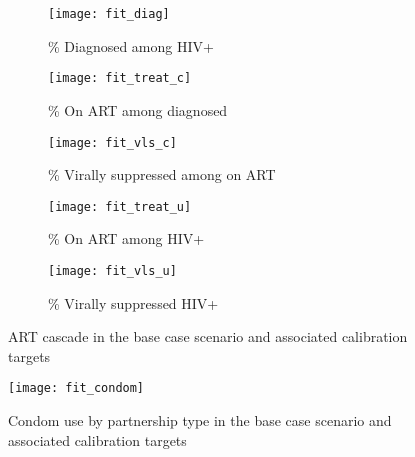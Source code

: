 \begin{figure}[h]
  \begin{subfigure}{\linewidth}
    \texttt{[image: fit\_diag]}
    \caption{\% Diagnosed among HIV+}
    \label{fig:fit.cas.dx}
  \end{subfigure}
  \begin{subfigure}{\linewidth}
    \texttt{[image: fit\_treat\_c]}
    \caption{\% On ART among diagnosed}
    \label{fig:fit.cas.treat-c}
  \end{subfigure}
  \begin{subfigure}{\linewidth}
    \texttt{[image: fit\_vls\_c]}
    \caption{\% Virally suppressed among on ART}
    \label{fig:fit.cas.vls-c}
  \end{subfigure}
  \begin{subfigure}{\linewidth}
    \texttt{[image: fit\_treat\_u]}
    \caption{\% On ART among HIV+}
    \label{fig:fit.cas.treat-u}
  \end{subfigure}
  \begin{subfigure}{\linewidth}
    \texttt{[image: fit\_vls\_u]}
    \caption{\% Virally suppressed HIV+}
    \label{fig:fit.cas.vls-u}
  \end{subfigure}
  \caption{ART cascade in the base case scenario and associated calibration targets}
  \label{fig:fit.cas}
\end{figure}
\clearpage\restoregeometry
\begin{figure}[h]
  \texttt{[image: fit\_condom]}
  \caption{Condom use by partnership type in the base case scenario and associated calibration targets}
  \label{fig:fit.condom}
\end{figure}
\clearpage
\printbibliography